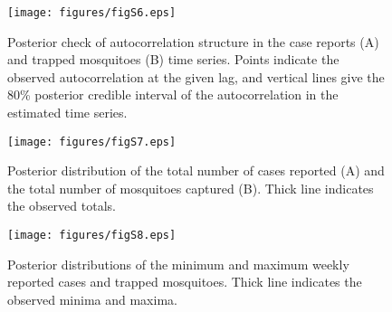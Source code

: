\documentclass[12pt,letterpaper]{article}
\begin{document}
\begin{figure}[!h]
\texttt{[image: figures/figS6.eps]}
\caption{Posterior check of autocorrelation structure in the case reports (A) and trapped mosquitoes (B) time series.  Points indicate the observed autocorrelation at the given lag, and vertical lines give the 80\% posterior credible interval of the autocorrelation in the estimated time series.
}
\end{figure}

\begin{figure}[!h]
\texttt{[image: figures/figS7.eps]}
\caption{
Posterior distribution of the total number of cases reported (A) and the total number of mosquitoes captured (B).  Thick line indicates the observed totals.
}
\end{figure}

\begin{figure}[!h]
\texttt{[image: figures/figS8.eps]}
\caption{
Posterior distributions of the minimum and maximum weekly reported cases and trapped mosquitoes. Thick line indicates the observed minima and maxima.
}
\end{figure}
\end{document}
